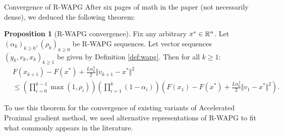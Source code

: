 \documentclass[11pt]{beamer}
\theoremstyle{definition}
\newtheorem{proposition}{Proposition}[section]
\begin{document}
    \begin{frame}{Convergence of R-WAPG}
        After six pages of math in the paper (not necessarily dense), we deduced the following theorem: 
        \begin{proposition}[R-WAPG convergence]\label{prop:wapg-convergence}
            Fix any arbitrary $x^* \in \mathbb R^n$.
            Let $(\alpha_k)_{k \ge 0}, (\rho_k)_{k \ge 0}$ be R-WAPG sequences.
            Let vector sequences $(y_k, v_{k}, x_{k})_{k \ge 1}$ be given by Definition \ref{def:wapg}. 
            Then for all $k \ge 1$:
            {\small
            \begin{align*}
                & F(x_{k + 1}) - F(x^*) + \frac{L \alpha_k^2}{2}\Vert v_{k + 1} - x^*\Vert^2
                \\
                &\le
                \left(
                    \prod_{i = 0}^{k - 1} \max(1, \rho_{i})
                \right)
                \left(
                    \prod_{i = 1}^{k} \left(1  - \alpha_i\right)
                \right)
                \left(
                    F(x_1) - F(x^*) + \frac{L\alpha_0^2}{2}\Vert v_1 - x^*\Vert^2
                \right).
            \end{align*}
            }
        \end{proposition}
        To use this theorem for the convergence of existing variants of Accelerated Proximal gradient method, we need alternative representations of R-WAPG to fit what commonly appears in the literature. 
    \end{frame}
\end{document}
